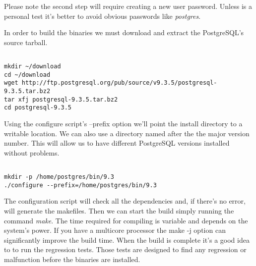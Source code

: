 %
%

Please note the second step will require creating a new user password. Unless
is a personal test it's better to avoid obvious passwords like
\textit{postgres}.\newline

In order to build the binaries we must download and extract the PostgreSQL's
source tarball.

\begin{verbatim}

mkdir ~/download
cd ~/download
wget http://ftp.postgresql.org/pub/source/v9.3.5/postgresql-9.3.5.tar.bz2
tar xfj postgresql-9.3.5.tar.bz2
cd postgresql-9.3.5

\end{verbatim}

Using the configure script's --prefix option we'll point the install directory
to a writable location. We can also use a directory named after the the major
version number. This will allow us to have different PostgreSQL versions
installed without problems.

\begin{verbatim}

mkdir -p /home/postgres/bin/9.3
./configure --prefix=/home/postgres/bin/9.3

\end{verbatim}

The configuration script will check all the dependencies and, if there's no
error, will generate the makefiles. Then we can start the build simply running
the command \textit{make}. The time required for compiling is variable and
depends on the system's power. If you have a multicore processor the make -j
option can significantly improve the build time. When the build is complete
it's a good idea to to run the regression tests. Those tests are designed to
find any regression or malfunction before the binaries are installed.

